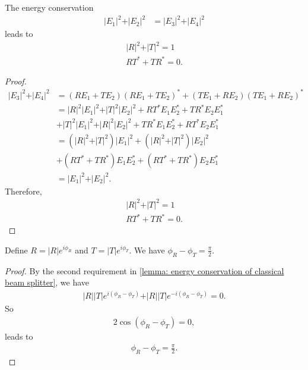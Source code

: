 \documentclass[../../note.tex]{subfiles}
\begin{document}
\begin{lemma}
    \label{lemma: energy conservation of classical beam splitter}
    The energy conservation 
    \begin{align}
        \vert E_1 \vert^2 + \vert E_2 \vert^2
        &=  \vert E_3 \vert^2 + \vert E_4 \vert^2
    \end{align}
    leads to 
    \begin{align}
        \vert R \vert^2 + \vert T \vert^2 = 1 \\
        R T^\ast + T R^\ast = 0.
    \end{align}
\end{lemma}
\begin{proof}
    \begin{align}
        \vert E_3 \vert^2 + \vert E_4 \vert^2
        &= (R E_1 + T E_2) (R E_1 + T E_2)^\ast + (T E_1 + R E_2) (T E_1 + R E_2)^\ast \\
        &= \vert R \vert^2 \vert E_1 \vert^2 + \vert T \vert^2 \vert E_2 \vert^2 + R T^\ast E_1 E_2^\ast + T R^\ast E_2 E_1^\ast \\
        &+ \vert T \vert^2 \vert E_1 \vert^2 + \vert R \vert^2 \vert E_2 \vert^2 + T R^\ast E_1 E_2^\ast + R T^\ast E_2 E_1^\ast \\
        &= (\vert R \vert^2 + \vert T \vert^2) \vert E_1 \vert^2 + (\vert R \vert^2 + \vert T \vert^2) \vert E_2 \vert^2 \\
        &+ (R T^\ast + T R^\ast) E_1 E_2^\ast + (R T^\ast + T R^\ast) E_2 E_1^\ast \\
        &= \vert E_1 \vert^2 + \vert E_2 \vert^2.
    \end{align}
    Therefore,
    \begin{align}
        \vert R \vert^2 + \vert T \vert^2 = 1 \\
        R T^\ast + T R^\ast = 0.
    \end{align}
\end{proof}

\begin{lemma}
    Define $R = \vert R \vert e^{i \phi_R}$ and $T = \vert T \vert e^{i \phi_T}$. We have $\phi_R - \phi_T = \frac{\pi}{2}$.
\end{lemma}
\begin{proof}
    By the second requirement in \ref{lemma: energy conservation of classical beam splitter}, we have
    \begin{align}
        \vert R \vert \vert T \vert e^{i(\phi_R - \phi_T)} + \vert R \vert \vert T \vert e^{-i(\phi_R - \phi_T)} = 0.
    \end{align}
    So 
    \begin{align}
        2 \cos(\phi_R - \phi_T) = 0,
    \end{align}
    leads to
    \begin{align}
        \phi_R - \phi_T = \frac{\pi}{2}.
    \end{align}
\end{proof}
\end{document}
